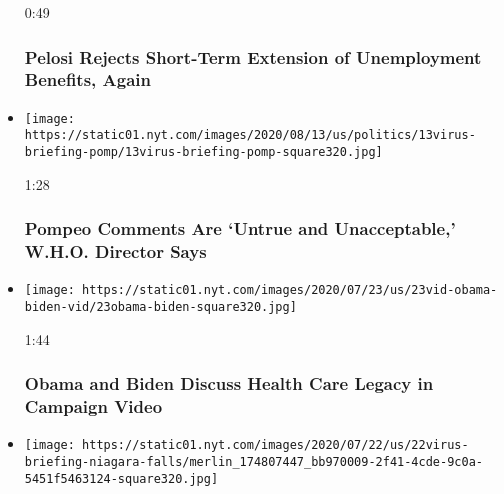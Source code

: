 \begin{itemize}
  0:49

  \hypertarget{pelosi-rejects-short-term-extension-of-unemployment-benefits-again}{%
  \subsubsection{Pelosi Rejects Short-Term Extension of Unemployment
  Benefits,
  Again}\label{pelosi-rejects-short-term-extension-of-unemployment-benefits-again}}
\item
  \href{https://www.nytimes.com/video/world/100000007253595/world-health-organization-pompeo-china.html?action=click\&module=video-series-bar\&region=header\&pgtype=Article\&playlistId=video/coronavirus-news-update}{}

  \texttt{[image: https://static01.nyt.com/images/2020/08/13/us/politics/13virus-briefing-pomp/13virus-briefing-pomp-square320.jpg]}

  1:28

  \hypertarget{pompeo-comments-are-untrue-and-unacceptable-who-director-says}{%
  \subsubsection{Pompeo Comments Are `Untrue and Unacceptable,' W.H.O.
  Director
  Says}\label{pompeo-comments-are-untrue-and-unacceptable-who-director-says}}
\item
  \href{https://www.nytimes.com/video/us/politics/100000007253264/obama-biden-conversation.html?action=click\&module=video-series-bar\&region=header\&pgtype=Article\&playlistId=video/coronavirus-news-update}{}

  \texttt{[image: https://static01.nyt.com/images/2020/07/23/us/23vid-obama-biden-vid/23obama-biden-square320.jpg]}

  1:44

  \hypertarget{obama-and-biden-discuss-health-care-legacy-in-campaign-video}{%
  \subsubsection{Obama and Biden Discuss Health Care Legacy in Campaign
  Video}\label{obama-and-biden-discuss-health-care-legacy-in-campaign-video}}
\item
  \href{https://www.nytimes.com/video/world/europe/100000007251464/niagara-falls-tour-boats.html?action=click\&module=video-series-bar\&region=header\&pgtype=Article\&playlistId=video/coronavirus-news-update}{}

  \texttt{[image: https://static01.nyt.com/images/2020/07/22/us/22virus-briefing-niagara-falls/merlin\_174807447\_bb970009-2f41-4cde-9c0a-5451f5463124-square320.jpg]}


\end{itemize}
